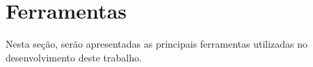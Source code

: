 





\section{Ferramentas}
\label{sec:tools}
Nesta seção, serão apresentadas as principais ferramentas utilizadas no desenvolvimento deste trabalho.

